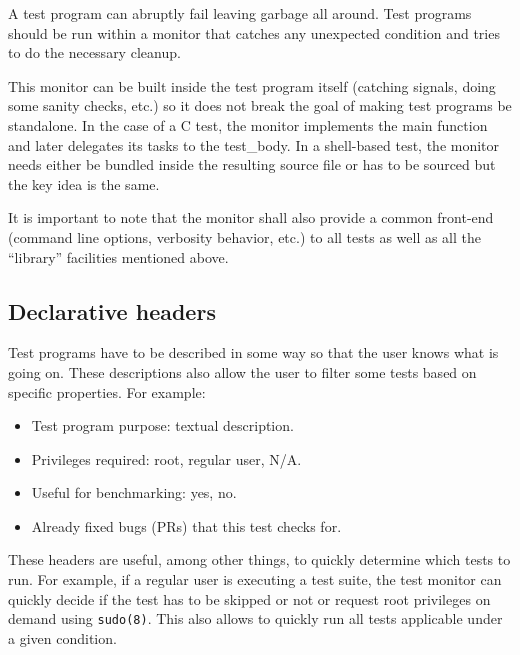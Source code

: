 \documentclass[a4paper,10pt]{article}
\begin{document}
A test program can abruptly fail leaving garbage all around.  Test programs
should be run within a monitor that catches any unexpected condition and
tries to do the necessary cleanup.

This monitor can be built inside the test program itself (catching signals,
doing some sanity checks, etc.) so it does not break the goal of making
test programs be standalone.  In the case of a C test, the monitor
implements the main function and later delegates its tasks to the
test\_body.  In a shell-based test, the monitor needs either be bundled
inside the resulting source file or has to be sourced but the key idea is
the same.

It is important to note that the monitor shall also provide a common
front-end (command line options, verbosity behavior, etc.) to all tests as
well as all the ``library'' facilities mentioned above.


\subsection{Declarative headers}

Test programs have to be described in some way so that the user knows what
is going on.  These descriptions also allow the user to filter some tests
based on specific properties.  For example:

\begin{itemize}

\item Test program purpose: textual description.

\item Privileges required: root, regular user, N/A.

\item Useful for benchmarking: yes, no.

\item Already fixed bugs (PRs) that this test checks for.

\end{itemize}

These headers are useful, among other things, to quickly determine which
tests to run.  For example, if a regular user is executing a test suite,
the test monitor can quickly decide if the test has to be skipped or not
or request root privileges on demand using \verb*|sudo(8)|.  This also
allows to quickly run all tests applicable under a given condition.
\end{document}
